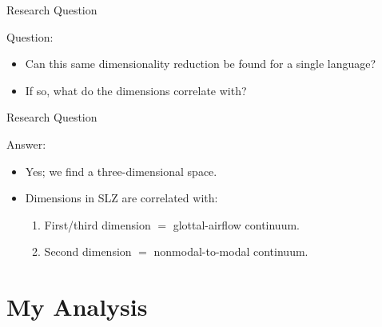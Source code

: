 \documentclass{beamer}
\begin{document}
\begin{frame}{Research Question}
  \begin{block}{Question:}
    \begin{itemize}
      \item Can this same dimensionality reduction be found for a single language?
      \item If so, what do the dimensions correlate with?
    \end{itemize}
  \end{block}
\end{frame}

\begin{frame}{Research Question}
  \begin{block}{Answer:}
    \begin{itemize}
      \item Yes; we find a three-dimensional space.
      \item Dimensions in SLZ are correlated with:
      \begin{enumerate}
        \item First/third dimension $=$ glottal-airflow continuum. 
        \item Second dimension $=$ nonmodal-to-modal continuum.
      \end{enumerate}
    \end{itemize}  
  \end{block}
\end{frame}


\section{My Analysis}
\end{document}
